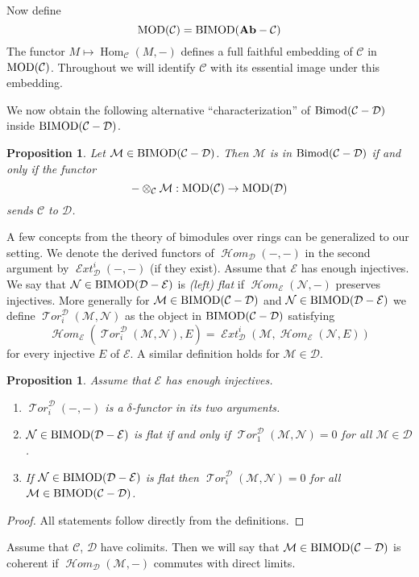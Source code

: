 \documentclass{amsproc}
\def\Cscr{{\mathcal C}}
\def\Dscr{{\mathcal D}}
\def\Escr{{\mathcal E}}
\def\Hscr{{\mathcal H}}
\def\Mscr{{\mathcal M}}
\def\Nscr{{\mathcal N}}
\def\Tscr{{\mathcal T}}
\def\HHom{\operatorname {\Hscr \mathit{om}}}
\def\HExt{\operatorname {\Escr \mathit{xt}}}
\def\HTor{\operatorname {\Tscr \mathit{or}}}
\def\Ab{\mathbf{Ab}}
\def\MOD{\mathop{\text{MOD}}}
\def\Bimod{\mathop{\text{Bimod}}}
\def\BIMOD{\mathop{\text{BIMOD}}}
\def\Hom{\operatorname {Hom}}
\def\HHom{\operatorname {\Hscr \mathit{om}}}
\def\HExt{\operatorname {\Escr \mathit{xt}}}
\def\HTor{\operatorname {\Tscr \mathit{or}}}
\def\r{\rightarrow}
\let\oldtext\text
\def\text#1{\oldtext{\upshape #1}}
\newtheorem{propositions}[lemmas]{Proposition}
\theoremstyle{definition}
\theoremstyle{remark}
\numberwithin{equation}{section}
\numberwithin{table}{section}
\numberwithin{figure}{section}
\begin{document}
Now define
\[
\MOD(\Cscr)=\BIMOD(\Ab-\Cscr)
\]
The functor $M\mapsto \Hom_\Cscr(M,-)$ defines a full faithful
embedding of $\Cscr$ in $\MOD(\Cscr)$. Throughout we will identify
$\Cscr$ with its essential image under this embedding.

We now obtain the following alternative ``characterization'' of
$\Bimod(\Cscr-\Dscr)$ inside $\BIMOD(\Cscr-\Dscr)$.
\begin{propositions}
\label{ref:3.1.4a}
Let $\Mscr\in\BIMOD(\Cscr-\Dscr)$. Then $\Mscr$ is in
$\Bimod(\Cscr-\Dscr)$ if and only if the functor
\[
-\otimes_\Cscr\Mscr:\MOD(\Cscr)\r \MOD(\Dscr)
\]
sends $\Cscr$ to $\Dscr$.
\end{propositions}
A few concepts from the theory of bimodules over rings can be
generalized to our setting. We denote the derived functors of
$\HHom_\Dscr(-,-)$ in the second argument by $\HExt^i_\Dscr(-,-)$ (if
they exist).  Assume that $\Escr$ has enough injectives. We say that
$\Nscr\in \BIMOD(\Dscr-\Escr)$ is \emph{(left) flat} if
$\HHom_\Escr(\Nscr,-)$ preserves injectives. More generally for
$\Mscr\in \BIMOD(\Cscr-\Dscr)$ and $\Nscr\in\BIMOD(\Dscr-\Escr)$ we
define $\HTor^\Dscr_i(\Mscr, \Nscr)$ as the object in
$\BIMOD(\Cscr-\Dscr)$ satisfying
\begin{equation}
\label{ref:3.1b}
\HHom_\Escr(\HTor^\Dscr_i(\Mscr,\Nscr),E)\overset{}{=}
\HExt^i_\Dscr(\Mscr,\HHom_\Escr(\Nscr,E))
\end{equation}
for every injective $E$ of $\Escr$. A similar definition holds for
$\Mscr\in\Dscr$. 
\begin{propositions} 
\label{ref:3.1.5a}
Assume that $\Escr$ has enough injectives. 
\begin{enumerate}
\item $\HTor^\Dscr_i(-,-)$ is a $\delta$-functor in its two arguments.
\item $\Nscr\in \BIMOD(\Dscr-\Escr)$ is flat if and only if
  $\HTor^\Dscr_1(\Mscr,\Nscr)=0$ for all $\Mscr\in\Dscr$.
\item
If $\Nscr\in \BIMOD(\Dscr-\Escr)$ is flat then
$\HTor^\Dscr_i(\Mscr,\Nscr)=0$ for all $\Mscr\in \BIMOD(\Cscr-\Dscr)$.
\end{enumerate}
\end{propositions}
\begin{proof}
All statements follow directly from the definitions.
\end{proof}
Assume that $\Cscr$, $\Dscr$ have colimits. Then we will say that
$\Mscr\in\BIMOD(\Cscr-\Dscr)$ is coherent if $\HHom_\Dscr(\Mscr,-)$ commutes
with direct limits.
\end{document}
